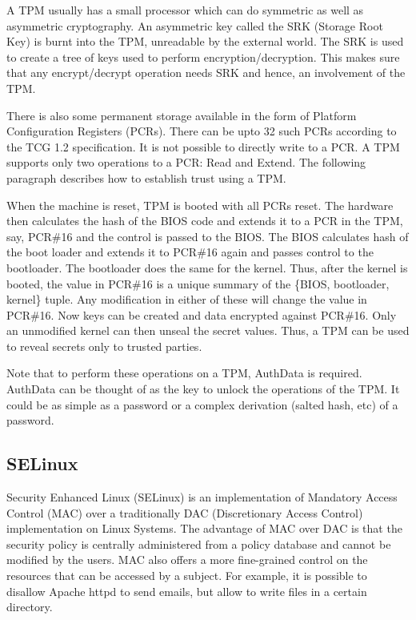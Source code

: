 \documentclass[10pt,twocolumn,pdftex]{article}
\begin{document}
A TPM usually has a small processor which can do symmetric as well as asymmetric cryptography. An asymmetric key called the SRK (Storage Root Key) is burnt into the TPM, unreadable by the external world. The SRK is used to create a tree of keys used to perform encryption/decryption. This makes sure that any encrypt/decrypt operation needs SRK and hence, an involvement of the TPM.

There is also some permanent storage available in the form of Platform Configuration Registers (PCRs). There can be upto 32 such PCRs according to the TCG 1.2 specification. It is not possible to directly write to a PCR. A TPM supports only two operations to a PCR: Read and Extend. The following paragraph describes how to establish trust using a TPM.

When the machine is reset, TPM is booted with all PCRs reset. The hardware then calculates the hash of the BIOS code and extends it to a PCR in the TPM, say, PCR\#16 and the control is passed to the BIOS. The BIOS calculates hash of the boot loader and extends it to PCR\#16 again and passes control to the bootloader. The bootloader does the same for the kernel. Thus, after the kernel is booted, the value in PCR\#16 is a unique summary of the \{BIOS, bootloader, kernel\} tuple. Any modification in either of these will change the value in PCR\#16. Now keys can be created and data encrypted against PCR\#16. Only an unmodified kernel can then unseal the secret values. Thus, a TPM can be used to reveal secrets only to trusted parties. 

Note that to perform these operations on a TPM, AuthData is required. AuthData can be thought of as the key to unlock the operations of the TPM. It could be as simple as a password or a complex derivation (salted hash, etc) of a password. 

\subsection{SELinux}
\label{sec:selinux}
Security Enhanced Linux (SELinux) \cite{SELinux} is an implementation of Mandatory Access Control (MAC) over a traditionally DAC (Discretionary Access Control) implementation on Linux Systems. The advantage of MAC over DAC is that the security policy is centrally administered from a policy database and cannot be modified by the users. MAC also offers a more fine-grained control on the resources that can be accessed by a subject. For example, it is possible to disallow Apache httpd to send emails, but allow to write files in a certain directory.
\end{document}
